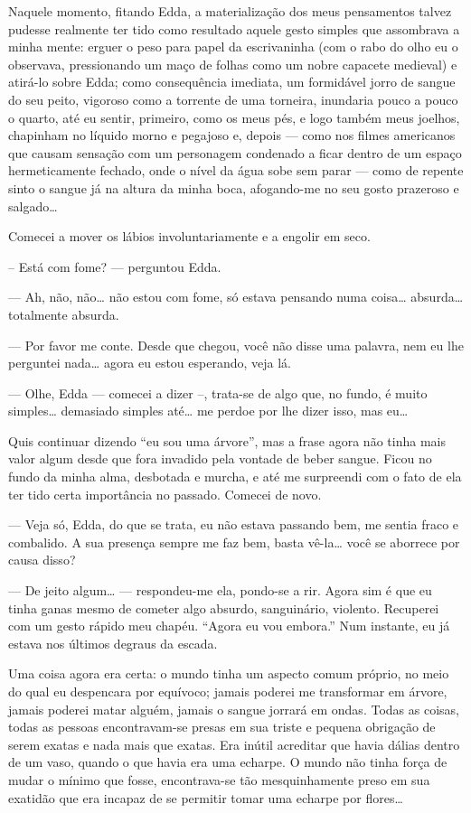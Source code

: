 Naquele momento, fitando Edda, a materialização dos meus pensamentos talvez pudesse realmente ter tido como resultado aquele gesto simples que assombrava a minha mente: erguer o peso para papel da escrivaninha (com o rabo do olho eu o observava, pressionando um maço de folhas como um nobre capacete medieval) e atirá-lo sobre Edda; como consequência imediata, um formidável jorro de sangue do seu peito, vigoroso como a torrente de uma torneira, inundaria pouco a pouco o quarto, até eu sentir, primeiro, como os meus pés, e logo também meus joelhos, chapinham no líquido morno e pegajoso e, depois --- como nos filmes americanos que causam sensação com um personagem condenado a ficar dentro de um espaço hermeticamente fechado, onde o nível da água sobe sem parar --- como de repente sinto o sangue já na altura da minha boca, afogando-me no seu gosto prazeroso e salgado\ldots{}

Comecei a mover os lábios involuntariamente e a engolir em seco.

-- Está com fome? --- perguntou Edda.

--- Ah, não, não\ldots{} não estou com fome, só estava pensando numa coisa\ldots{} absurda\ldots{} totalmente absurda.

--- Por favor me conte. Desde que chegou, você não disse uma palavra, nem eu lhe perguntei nada\ldots{} agora eu estou esperando, veja lá.

--- Olhe, Edda --- comecei a dizer --, trata-se de algo que, no fundo, é muito simples\ldots{} demasiado simples até\ldots{} me perdoe por lhe 
dizer isso, mas eu\ldots{}

Quis continuar dizendo ``eu sou uma árvore'', mas a frase agora não tinha mais valor algum desde que fora invadido pela vontade de beber sangue. Ficou no fundo da minha alma, desbotada e murcha, e até me surpreendi com o fato de ela ter tido certa importância no passado.
Comecei de novo.

--- Veja só, Edda, do que se trata, eu não estava passando bem, me sentia fraco e combalido. A sua presença sempre me faz bem, basta vê-la\ldots{} você se aborrece por causa disso?

--- De jeito algum\ldots{} --- respondeu-me ela, pondo-se a rir.
Agora sim é que eu tinha ganas mesmo de cometer algo absurdo, sanguinário, violento. Recuperei com um gesto rápido meu chapéu. ``Agora eu vou embora.'' Num instante, eu já estava nos últimos degraus da escada.

Uma coisa agora era certa: o mundo tinha um aspecto comum próprio, no meio do qual eu despencara por equívoco; jamais poderei me transformar em árvore, jamais poderei matar alguém, jamais o sangue jorrará em ondas. Todas as coisas, todas as pessoas encontravam-se presas em sua triste e pequena obrigação de serem exatas e nada mais que exatas. Era inútil acreditar que havia dálias dentro de um vaso, quando o que havia era uma echarpe. O mundo não tinha força de mudar o mínimo que fosse, encontrava-se tão mesquinhamente preso em sua exatidão que era incapaz de se permitir tomar uma echarpe por flores\ldots{}

